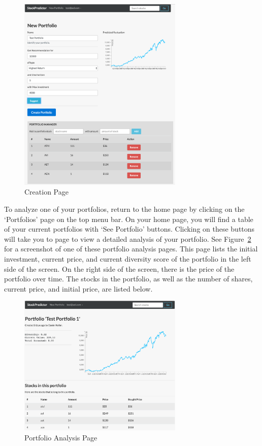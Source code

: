 \documentclass{article}
\begin{document}
\begin{figure}[H]
\begin{center}
\includegraphics[width=0.7\textwidth]{creation}
\caption{\label{fig:creation} Creation Page}
\end{center}
\end{figure}

To analyze one of your portfolios, return to the home page by clicking on the `Portfolios' page on the top menu bar. On your home page, you will find a table of your current portfolios with `See Portfolio' buttons. Clicking on these buttons will take you to page to view a detailed analysis of your portfolio. See Figure~\ref{fig:analysis} for a screenshot of one of these portfolio analysis pages. This page lists the initial investment, current price, and current diversity score of the portfolio in the left side of the screen. On the right side of the screen, there is the price of the portfolio over time. The stocks in the portfolio, as well as the number of shares, current price, and initial price, are listed below. 

\begin{figure}[H]
\begin{center}
\includegraphics[width=0.7\textwidth]{analysis}
\caption{\label{fig:analysis} Portfolio Analysis Page}
\end{center}
\end{figure}
\end{document}
